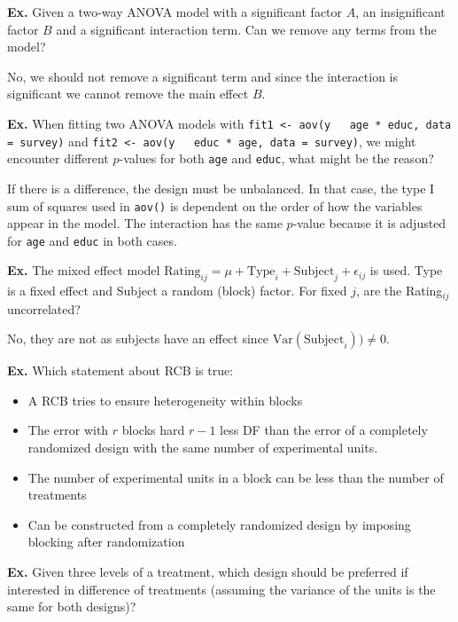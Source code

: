 \hrulefill

\textbf{Ex.} Given a two-way ANOVA model with a significant factor $A$, an insignificant factor $B$ and a significant interaction term. Can we remove any terms from the model? \medskip

No, we should not remove a significant term and since the interaction is significant we cannot remove the main effect $B$.


\hrulefill

\textbf{Ex.} When fitting two ANOVA models with \texttt{fit1 <- aov(y ~ age * educ, data = survey)} and \texttt{fit2 <- aov(y ~ educ * age, data = survey)}, we might encounter different $p$-values for both \texttt{age} and \texttt{educ}, what might be the reason? \medskip

If there is a difference, the design must be unbalanced. In that case, the type I sum of squares used in \texttt{aov()} is dependent on the order of how the variables appear in the model. The interaction has the same $p$-value because it is adjusted for \texttt{age} and \texttt{educ} in both cases.


\hrulefill

\textbf{Ex.} The mixed effect model $\text{Rating}_{ij} = \mu + \text{Type}_i + \text{Subject}_j + \epsilon_{ij}$ is used. Type is a fixed effect and Subject a random (block) factor. For fixed $j$, are the Rating$_{ij}$ uncorrelated? \medskip

No, they are not as subjects have an effect since $\text{Var}(\text{Subject}_i)) \neq 0$.


\hrulefill

\textbf{Ex.} Which statement about RCB is true:
\begin{itemize}
	\item[$\square$]  A RCB tries to ensure heterogeneity within blocks
	\item[$\boxtimes$] The error with $r$ blocks hard $r-1$ less DF than the error of a completely randomized design with the same number of experimental units.
	\item[$\square$] The number of experimental units in a block can be less than the number of treatments
	\item[$\square$] Can be constructed from a completely randomized design by imposing blocking after randomization
\end{itemize}


\hrulefill

\textbf{Ex.} Given three levels of a treatment, which design should be preferred if interested in difference of treatments (assuming the variance of the units is the same for both designs)?\smallskip

